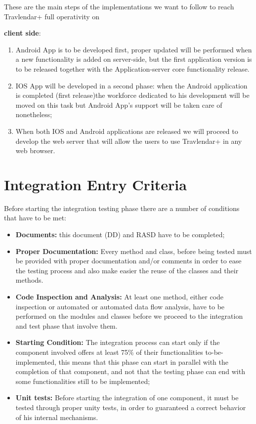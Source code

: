 These are the main steps of the implementations we want to follow to reach Travlendar+ full operativity on\begin{large}
\textbf{client side}:
\end{large}
\begin{enumerate}
\item Android App is to be developed first, proper updated will be performed when a new functionality is added on server-side, but the first application version is to be released together with the Application-server core functionality release.
\item IOS App will be developed in a second phase: when the Android application is completed (first release)the workforce dedicated to his development will be moved on this task but Android App's support will be taken care of nonetheless;
\item When both IOS and Android applications are released we will proceed to develop the web server that will allow the users to use Travlendar+ in any web browser.
\end{enumerate}

\section{Integration Entry Criteria}
Before starting the integration testing phase there are a number of conditions that have to be met:
\begin{itemize}
\item \textbf{Documents:} this document (DD) and RASD have to be completed;
\item \textbf{Proper Documentation:} Every method and class, before being tested must be provided with proper documentation and/or comments in order to ease the testing process and also make easier the reuse of the classes and their methods.
\item \textbf{Code Inspection and Analysis:} At least one method, either code inspection or automated or automated data flow analysis, have to be performed on the modules and classes before we proceed to the integration and test phase that involve them.
\item \textbf{Starting Condition:} The integration process can start only if the component involved offers at least 75\% of their functionalities to-be-implemented, this means that this phase can start in parallel with the completion of that component, and not that the testing phase can end with some functionalities still to be implemented; 
\item \textbf{Unit tests:} Before starting the integration of one component, it must be tested through proper unity tests, in order to guaranteed a correct behavior of his internal mechanisms.
\end{itemize}
